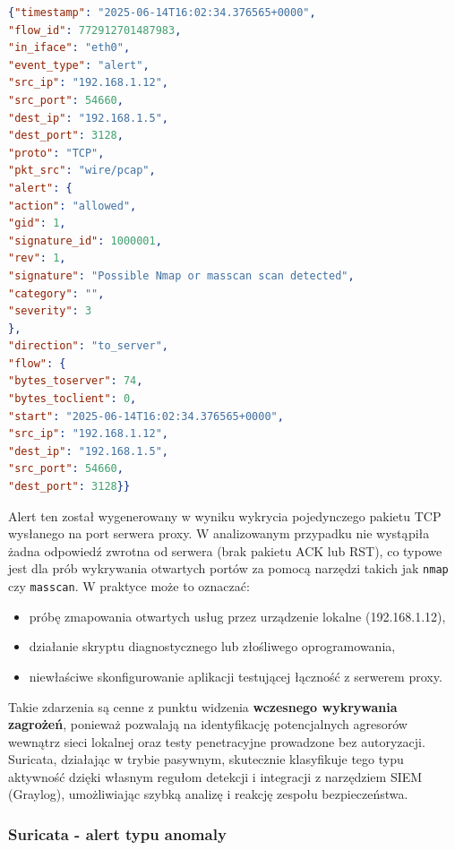 \documentclass[
    left=2.5cm,         %
    right=2.5cm,        %
    top=2.5cm,          %
    bottom=3cm,         %
    bindingoffset=6mm,  %
    nohyphenation=true %
]{eiti/eiti-thesis} %
\begin{document}
\begin{lstlisting}[language=json, caption={Alert Suricaty typu \texttt{Possible Nmap or masscan scan detected} na porcie \texttt{3128/TCP}}, label={lst:suricata-proxy-alert}]
{"timestamp": "2025-06-14T16:02:34.376565+0000",
"flow_id": 772912701487983,
"in_iface": "eth0",
"event_type": "alert",
"src_ip": "192.168.1.12",
"src_port": 54660,
"dest_ip": "192.168.1.5",
"dest_port": 3128,
"proto": "TCP",
"pkt_src": "wire/pcap",
"alert": {
"action": "allowed",
"gid": 1,
"signature_id": 1000001,
"rev": 1,
"signature": "Possible Nmap or masscan scan detected",
"category": "",
"severity": 3
},
"direction": "to_server",
"flow": {
"bytes_toserver": 74,
"bytes_toclient": 0,
"start": "2025-06-14T16:02:34.376565+0000",
"src_ip": "192.168.1.12",
"dest_ip": "192.168.1.5",
"src_port": 54660,
"dest_port": 3128}}
\end{lstlisting}

Alert ten został wygenerowany w wyniku wykrycia pojedynczego pakietu TCP wysłanego na port serwera proxy. W analizowanym przypadku nie wystąpiła żadna odpowiedź zwrotna od serwera (brak pakietu ACK lub RST), co typowe jest dla prób wykrywania otwartych portów za pomocą narzędzi takich jak \texttt{nmap} czy \texttt{masscan}. W praktyce może to oznaczać:
\begin{itemize}
\item próbę zmapowania otwartych usług przez urządzenie lokalne (192.168.1.12),
\item działanie skryptu diagnostycznego lub złośliwego oprogramowania,
\item niewłaściwe skonfigurowanie aplikacji testującej łączność z serwerem proxy.
\end{itemize}

Takie zdarzenia są cenne z punktu widzenia \textbf{wczesnego wykrywania zagrożeń}, ponieważ pozwalają na identyfikację potencjalnych agresorów wewnątrz sieci lokalnej oraz testy penetracyjne prowadzone bez autoryzacji. Suricata, działając w trybie pasywnym, skutecznie klasyfikuje tego typu aktywność dzięki własnym regułom detekcji i integracji z narzędziem SIEM (Graylog), umożliwiając szybką analizę i reakcję zespołu bezpieczeństwa.


\subsubsection{Suricata - alert typu anomaly}
\end{document}
